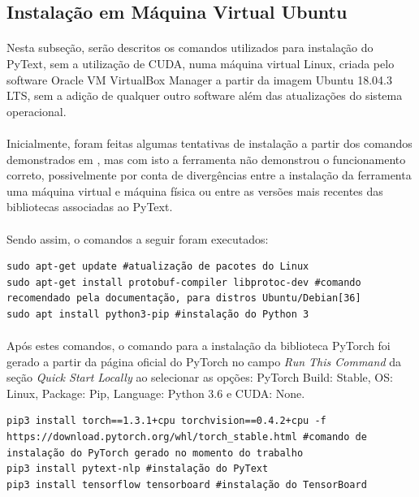 \documentclass[grad,numbers]{coppe}
\begin{document}
  	\subsection{Instalação em Máquina Virtual Ubuntu}
  		\paragraph{}Nesta subseção, serão descritos os comandos utilizados para instalação do PyText, sem a utilização de CUDA, numa máquina virtual Linux, criada pelo software Oracle VM VirtualBox Manager a partir da imagem Ubuntu 18.04.3 LTS, sem a adição de qualquer outro software além das atualizações do sistema operacional.
  		\paragraph{}Inicialmente, foram feitas algumas tentativas de instalação a partir dos comandos demonstrados em \cite{vinicius-pytext}, mas com isto a ferramenta não demonstrou o funcionamento correto, possivelmente por conta de divergências entre a instalação da ferramenta uma máquina virtual e máquina física ou entre as versões mais recentes das bibliotecas associadas ao PyText.
  		\paragraph{}Sendo assim, o comandos a seguir foram executados:
			\begin{verbatim}
sudo apt-get update #atualização de pacotes do Linux
sudo apt-get install protobuf-compiler libprotoc-dev #comando recomendado pela documentação, para distros Ubuntu/Debian[36]
sudo apt install python3-pip #instalação do Python 3
  		\end{verbatim}
  		\paragraph{}Após estes comandos, o comando para a instalação da biblioteca PyTorch foi gerado a partir da página oficial do PyTorch\cite{pytorch-page} no campo \textit{Run This Command} da seção \textit{Quick Start Locally} ao selecionar as opções: PyTorch Build: Stable, OS: Linux, Package: Pip, Language: Python 3.6 e CUDA: None.
			\begin{verbatim}
pip3 install torch==1.3.1+cpu torchvision==0.4.2+cpu -f https://download.pytorch.org/whl/torch_stable.html #comando de instalação do PyTorch gerado no momento do trabalho
pip3 install pytext-nlp #instalação do PyText
pip3 install tensorflow tensorboard #instalação do TensorBoard
			\end{verbatim}
\end{document}
